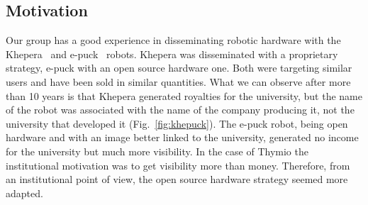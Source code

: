 \documentclass[letterpaper, 10 pt, conference]{ieeeconf}  %
\begin{document}
\subsection{Motivation}

Our group has a good experience in disseminating robotic hardware with the Khepera~\cite{MonFraIen93} and e-puck~\cite{mondada2009puck} robots.
Khepera was disseminated with a proprietary strategy, e-puck with an open source hardware one.
Both were targeting similar users and have been sold in similar quantities.
What we can observe after more than 10 years is that Khepera generated royalties for the university, but the name of the robot was associated with the name of the company producing it, not the university that developed it (Fig.~\ref{fig:khepuck}).
The e-puck robot, being open hardware and with an image better linked to the university, generated no income for the university but much more visibility.
In the case of Thymio the institutional motivation was to get visibility more than money. 
Therefore, from an institutional point of view, the open source hardware strategy seemed more adapted.
\end{document}
